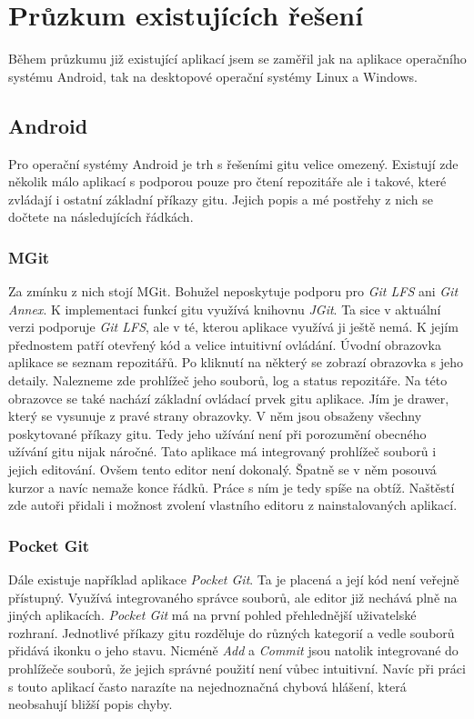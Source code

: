 \section{Průzkum existujících řešení}
Během průzkumu již existující aplikací jsem se zaměřil jak na aplikace operačního systému Android, tak na desktopové operační systémy Linux a Windows.

    \subsection {Android}
    Pro operační systémy Android je trh s řešeními gitu velice omezený. Existují zde několik málo aplikací s podporou pouze pro čtení repozitáře ale i takové, které zvládají i ostatní základní příkazy gitu. Jejich popis a mé postřehy z nich se dočtete na následujících řádkách.

        \subsubsection{MGit}
        Za zmínku z nich stojí MGit. Bohužel neposkytuje podporu pro \emph{Git LFS} ani \emph{Git Annex}. K implementaci funkcí gitu využívá knihovnu \emph{JGit}. Ta sice v aktuální verzi podporuje \emph{Git LFS}, ale v té, kterou aplikace využívá ji ještě nemá. K jejím přednostem patří otevřený kód a velice intuitivní ovládání.
        Úvodní obrazovka aplikace se seznam repozitářů. Po kliknutí na některý se zobrazí obrazovka s jeho detaily. Nalezneme zde prohlížeč jeho souborů, log a status repozitáře. Na této obrazovce se také nachází základní ovládací prvek gitu aplikace. Jím je drawer, který se vysunuje z pravé strany obrazovky. V něm jsou obsaženy všechny poskytované příkazy gitu. Tedy jeho užívání není při porozumění obecného užívání gitu nijak náročné. Tato aplikace má integrovaný prohlížeč souborů i jejich editování. Ovšem tento editor není dokonalý. Špatně se v něm posouvá kurzor a navíc nemaže konce řádků. Práce s ním je tedy spíše na obtíž. Naštěstí zde autoři přidali i možnost zvolení vlastního editoru z nainstalovaných aplikací.

        \subsubsection{Pocket Git}
        Dále existuje například aplikace \emph{Pocket Git}. Ta je placená a její kód není veřejně přístupný. Využívá integrovaného správce souborů, ale editor již nechává plně na jiných aplikacích. \emph{Pocket Git} má na první pohled přehlednější uživatelské rozhraní. Jednotlivé příkazy gitu rozděluje do různých kategorií a vedle souborů přidává ikonku o jeho stavu. Nicméně \emph{Add} a \emph{Commit} jsou natolik integrované do prohlížeče souborů, že jejich správné použití není vůbec intuitivní. Navíc při práci s touto aplikací často narazíte na nejednoznačná chybová hlášení, která neobsahují bližší popis chyby.

